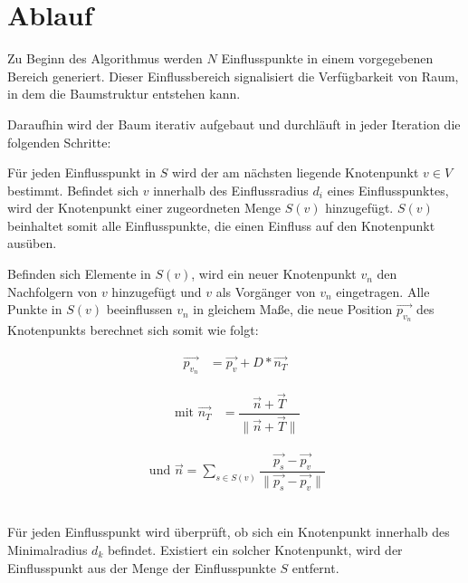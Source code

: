 \section{Ablauf}
\label{sec:SCA_Ablauf}
Zu Beginn des Algorithmus werden $N$ Einflusspunkte in einem vorgegebenen Bereich generiert. Dieser Einflussbereich signalisiert die Verfügbarkeit von Raum, in dem die Baumstruktur entstehen kann.  \cite[S.3]{SpaceColonizationAlgorithm:07}

Daraufhin wird der Baum iterativ aufgebaut und durchläuft in jeder Iteration die folgenden Schritte: 

\begin{description}[labelindent]
	\item[\boldmath$1.$] Für jeden Einflusspunkt in $S$ wird der am nächsten liegende Knotenpunkt $v\in V$ bestimmt. Befindet sich $v$ innerhalb des Einflussradius $d_i$ eines Einflusspunktes, wird der Knotenpunkt einer zugeordneten Menge $S(v)$ hinzugefügt. $S(v)$ beinhaltet somit alle Einflusspunkte, die einen Einfluss auf den Knotenpunkt ausüben. \cite[S.3]{SpaceColonizationAlgorithm:07} \label{alg:SCA_1}\\
	
	\item[\boldmath$2.$] Befinden sich Elemente in $S(v)$, wird ein neuer Knotenpunkt $v_n$ den Nachfolgern von $v$ hinzugefügt und $v$ als Vorgänger von $v_n$ eingetragen.  Alle Punkte in $S(v)$ beeinflussen $v_n$ in gleichem Maße, die neue Position $\overrightarrow{p_{v_n}}$ des Knotenpunkts berechnet sich somit wie folgt:
	
	\begin{equation}
	\begin{array}{ll}
	\overrightarrow{p_{v_n}} & = \overrightarrow{p_v} + D * \overrightarrow{n_{T}}
	\end{array}
	\end{equation} 
	
	\begin{equation}
	\begin{array}{ll}
	\text{  mit  } \overrightarrow{n_{T}} & = \dfrac{\overrightarrow{n} + \overrightarrow{T} }{\lVert\overrightarrow{n} + \overrightarrow{T}\rVert}  
	\end{array}
	\end{equation} 
	
	\begin{equation}
	\begin{array}{ll}
	\text{ und }  \overrightarrow{n} = \sum\limits_{s \in S(v)}\dfrac{\overrightarrow{p_s} - \overrightarrow{p_v}}{\lVert \overrightarrow{p_s} - \overrightarrow{p_v} \rVert}
	\end{array}
	\end{equation}	
	\cite[S.3]{SpaceColonizationAlgorithm:07} \label{alg:SCA_2}\\
	
	\item[\boldmath$3.$] Für jeden Einflusspunkt wird überprüft, ob sich ein Knotenpunkt innerhalb des Minimalradius $d_k$ befindet. Existiert ein solcher Knotenpunkt, wird der Einflusspunkt aus der Menge der Einflusspunkte $S$ entfernt. \cite[S.3]{SpaceColonizationAlgorithm:07} \label{alg:SCA_3}
\end{description}

